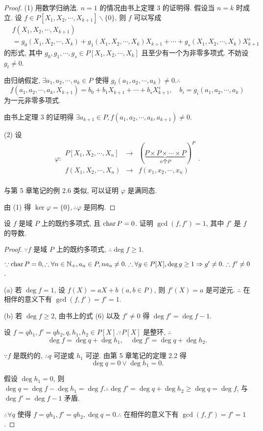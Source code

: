 \documentclass[color=black,device=normal,lang=cn,mode=geye]{elegantnote}
\begin{document}
\begin{proof}
    (1) 用数学归纳法. $n=1$ 的情况由书上定理 3 的证明得. 假设当 $n=k$ 时成立. 设 $f\in P[X_1,X_2,\cdots,X_{k+1}]\backslash\{0\}$, 则 $f$ 可以写成
    \begin{align*}
        & f(X_1,X_2,\cdots,X_{k+1}) \\
        & =g_0(X_1,X_2,\cdots,X_k)+g_1(X_1,X_2,\cdots,X_k)X_{k+1}+\cdots+g_s(X_1,X_2,\cdots,X_k)X^s_{k+1}
    \end{align*}
    的形式, 其中 $g_0,g_1,\cdots,g_s\in P[X_1,X_2,\cdots,X_k]$ 且至少有一个为非零多项式. 不妨设 $g_t\neq0$.

    由归纳假定, $\exists a_1,a_2,\cdots,a_k\in P$ 使得 $g_t(a_1,a_2,\cdots,a_k)\neq0.\therefore$
    \[f(a_1,a_2,\cdots,a_k,X_{k+1})=b_0+b_1X_{k+1}+\cdots+b_sX^s_{k+1},\quad b_i=g_i(a_1,a_2,\cdots,a_k)\]
    为一元非零多项式.

    由书上定理 3 的证明得 $\exists a_{k+1}\in P,f(a_1,a_2,\cdots,a_k,a_{k+1})\neq0$.

    (2) 设
    \[\varphi:\begin{array}{rcl}
        P[X_1,X_2,\cdots,X_n] & \to & (\underbrace{P\times P\times\cdots\times P}_{n\text{个}P})^P \\
        f(X_1,X_2,\cdots,X_n) & \to & f(x_1,x_2,\cdots,x_n) \\
    \end{array}.\]

    与第 5 章笔记的例 2.6 类似, 可以证明 $\varphi$ 是满同态.

    由 (1) 得 $\ker\varphi=\{0\},\therefore\varphi$ 是同构.
\end{proof}
\addtocounter{exercise}{3}
\begin{exercise}\label{ex1.6}
    设 $f$ 是域 $P$ 上的既约多项式, 且 $\operatorname{char} P=0$. 证明 $\gcd(f,f')=1$, 其中 $f'$ 是 $f$ 的导数.
\end{exercise}
\begin{proof}
    $\because f$ 是域 $P$ 上的既约多项式, $\therefore\deg f\geq1$.

    $\because\operatorname{char} P=0,\therefore\forall n\in\mathbb{N}_+,a_n\in P,na_n\neq0.\therefore\forall g\in P[X],\deg g\geq1\Rightarrow g'\neq0.\therefore f'\neq0$.

    (a) 若 $\deg f=1$, 设 $f(X)=aX+b\ (a,b\in P)$, 则 $f'(X)=a$ 是可逆元. $\therefore$ 在相伴的意义下有 $\gcd(f,f')=f'=1$.

    (b) 若 $\deg f\geq2$, 由书上的式 (6) 以及 $f'\neq0$ 得 $\deg f'=\deg f-1$.
    
    设 $f=qh_1,f'=qh_2,q,h_1,h_2\in P[X].\because P[X]$ 是整环, $\therefore$
    \[\deg f=\deg q+\deg h_1,\quad\deg f'=\deg q+\deg h_2.\]

    $\because f$ 是既约的, $\therefore q$ 可逆或 $h_1$ 可逆. 由第 5 章笔记的定理 2.2 得
    \[\deg q=0\vee\deg h_1=0.\]

    假设 $\deg h_1=0$, 则 $\deg q=\deg f-\deg h_1=\deg f.\therefore\deg f'=\deg q+\deg h_2\geq\deg q=\deg f$, 与 $\deg f'=\deg f-1$ 矛盾.

    $\therefore\forall q$ 使得 $f=qh_1,f'=qh_2,\deg q=0.\therefore$ 在相伴的意义下有 $\gcd(f,f')=f'=1$.
\end{proof}
\end{document}

